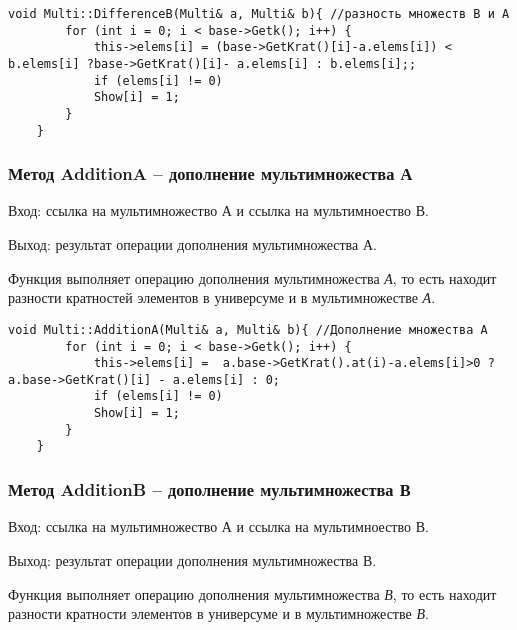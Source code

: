 \documentclass[10pt,a4paper,final]{article} %
\begin{document}

\begin{lstlisting}[caption={Метод DifferenceB}]
	void Multi::DifferenceB(Multi& a, Multi& b){ //разность множеств B и A
		for (int i = 0; i < base->Getk(); i++) {
			this->elems[i] = (base->GetKrat()[i]-a.elems[i]) < b.elems[i] ?base->GetKrat()[i]- a.elems[i] : b.elems[i];;
			if (elems[i] != 0)
			Show[i] = 1;
		}
	}
\end{lstlisting}


\subsubsection {Метод AdditionA -- дополнение мультимножества А}
\par Вход: ссылка на мультимножество А и ссылка на мультимноество В. 
\par Выход: результат операции дополнения мультимножества А.
\par Функция выполняет операцию дополнения мультимножества \textit{А}, то есть находит разности кратностей элементов в универсуме и в мультимножестве \textit{А}.

\begin{lstlisting}[caption={Метод AdditionA}]
	void Multi::AdditionA(Multi& a, Multi& b){ //Дополнение множества A
		for (int i = 0; i < base->Getk(); i++) {
			this->elems[i] =  a.base->GetKrat().at(i)-a.elems[i]>0 ? a.base->GetKrat()[i] - a.elems[i] : 0;
			if (elems[i] != 0)
			Show[i] = 1;
		}
	}
\end{lstlisting}


\subsubsection {Метод AdditionB -- дополнение мультимножества В}
\par Вход: ссылка на мультимножество А и ссылка на мультимноество В. 
\par Выход: результат операции дополнения мультимножества В.
\par Функция выполняет операцию дополнения мультимножества \textit{В}, то есть находит разности кратности элементов в универсуме и в мультимножестве \textit{В}.
\end{document}
